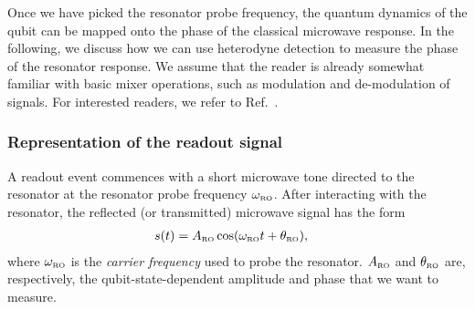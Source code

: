 \documentclass[aip,apr,twocolumn,showpacs,superscriptaddress,groupedaddress,nofootinbib,reprint]{revtex4-1}  %
\begin{document}
Once we have picked the resonator probe frequency, the quantum dynamics of the qubit can be mapped onto the phase of the classical microwave response. In the following, we discuss how we can use heterodyne detection to measure the phase of the resonator response. We assume that the reader is already somewhat familiar with basic mixer operations, such as modulation and de-modulation of signals. For interested readers, we refer to Ref.~.


\subsubsection{Representation of the readout signal}

A readout event commences with a short microwave tone directed to the resonator at the resonator probe frequency $\omega_{\mbox{\tiny{RO}}}$. After interacting with the resonator, the reflected (or transmitted) microwave signal has the form
%
\begin{align}\label{Eq:RO-signal}
s(t) &= A_{\mbox{\tiny{RO}}} \cos(\omega_{\mbox{\tiny{RO}}}t + \theta_{\mbox{\tiny{RO}}}), %
\end{align}
%
\noindent where $\omega_{\mbox{\tiny{RO}}}$ is the \textit{carrier frequency} used to probe the resonator. $A_{\mbox{\tiny{RO}}}$ and $\theta_{\mbox{\tiny{RO}}}$ are, respectively, the qubit-state-dependent amplitude and phase that we want to measure.
%
%
\end{document}
